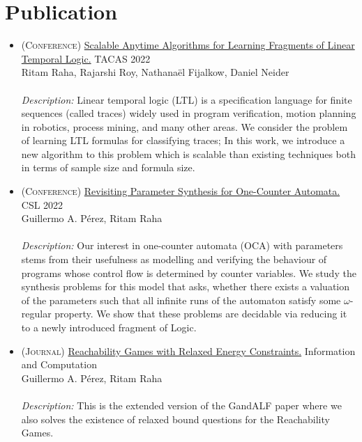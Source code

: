 \documentclass[a4paper,10pt]{article}
\begin{document}
\section{Publication}
\begin{itemize}
    \item \textsc{(Conference)}
    \href{https://dblp.org/rec/journals/corr/abs-2110-06726}{Scalable Anytime Algorithms for Learning Fragments of Linear Temporal Logic.} TACAS 2022\\
    Ritam Raha, Rajarshi Roy, Nathana\"el Fijalkow, Daniel Neider\\
    \\
    \emph{Description:} Linear temporal logic (LTL) is a specification language for finite sequences (called traces) widely used in program verification, motion planning in robotics, process mining, and many other areas. We consider the problem of learning LTL formulas for classifying traces; In this work, we introduce a new algorithm to this problem which is scalable than existing techniques both in terms of sample size and formula size.
    
    \item \textsc{(Conference)} \href{https://arxiv.org/abs/2005.01071}{Revisiting Parameter Synthesis for One-Counter Automata.} CSL 2022\\
    Guillermo A. P\'erez, Ritam Raha\\
    \\
    \emph{Description:} Our interest in one-counter automata (OCA) with parameters stems from their usefulness as modelling and verifying the behaviour of programs whose control flow is determined by counter variables. We study the synthesis problems for this model that asks, whether there exists a valuation of the parameters such that all infinite runs of the automaton satisfy some $\omega$-regular property. We show that these problems are decidable via reducing it to a newly introduced fragment of Logic.
    
    \item \textsc{(Journal)} \href{https://www.sciencedirect.com/science/article/abs/pii/S089054012100122X}{Reachability Games with Relaxed Energy Constraints.} Information and Computation \\
    Guillermo A. P\'erez, Ritam Raha\\
    \\
    \emph{Description:} This is the extended version of the GandALF paper where we also solves the existence of relaxed bound questions for the Reachability Games.
    

\end{itemize}
\end{document}
